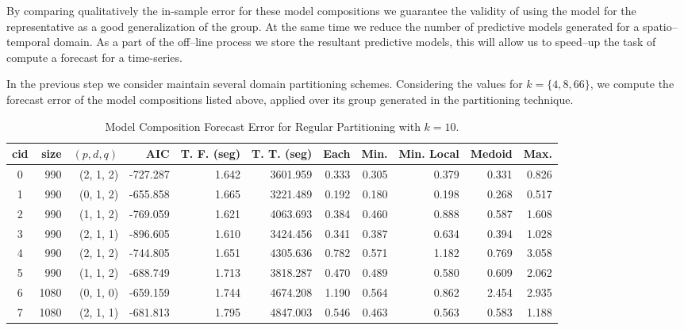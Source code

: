 By comparing qualitatively the in-sample error for these model compositions we guarantee the validity of using the model for the representative as a good generalization of the group. At the same time we reduce the number of predictive models generated for a spatio--temporal domain. As a part of the off--line process we store the resultant predictive models, this will allow us to speed--up the task of compute a forecast for a time-series.

In the previous step we consider maintain several domain partitioning schemes. Considering the values for $k = \{4, 8, 66\}$, we compute the forecast error of the model compositions listed above, applied over its group generated in the partitioning technique. %
\begin{table}[h]
	\centering
	\tiny
	\begin{tabular}{|c|r|r|r|r|r|r|r|r|r|r|}
		\hline
		cid & size & $(p, d, q)$ & AIC & T. F. (seg) & T. T. (seg) & Each & Min. & Min. Local & Medoid & Max. \\
		\hline
		0 &  990 & (2, 1, 2) & -727.287 & 1.642 & 3601.959 & 0.333 & 0.305 & 0.379 & 0.331 & 0.826 \\
		1 &  990 & (0, 1, 2) & -655.858 & 1.665 & 3221.489 & 0.192 & 0.180 & 0.198 & 0.268 & 0.517 \\
		2 &  990 & (1, 1, 2) & -769.059 & 1.621 & 4063.693 & 0.384 & 0.460 & 0.888 & 0.587 & 1.608 \\
		3 &  990 & (2, 1, 1) & -896.605 & 1.610 & 3424.456 & 0.341 & 0.387 & 0.634 & 0.394 & 1.028 \\
		4 &  990 & (2, 1, 2) & -744.805 & 1.651 & 4305.636 & 0.782 & 0.571 & 1.182 & 0.769 & 3.058 \\
		5 &  990 & (1, 1, 2) & -688.749 & 1.713 & 3818.287 & 0.470 & 0.489 & 0.580 & 0.609 & 2.062 \\
		6 & 1080 & (0, 1, 0) & -659.159 & 1.744 & 4674.208 & 1.190 & 0.564 & 0.862 & 2.454 & 2.935 \\
		7 & 1080 & (2, 1, 1) & -681.813 & 1.795 & 4847.003 & 0.546 & 0.463 & 0.563 & 0.583 & 1.188 \\ \hline
	\end{tabular}
	\caption{Model Composition Forecast Error for Regular Partitioning with $k=10$.}
	\label{Table:ForecastErrorRegulark10}
\end{table}

